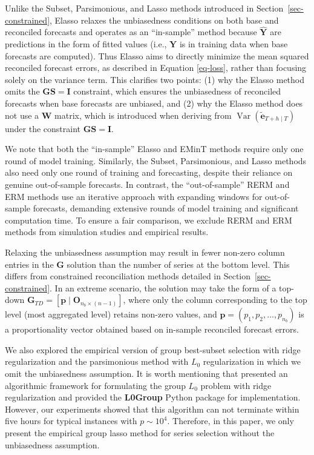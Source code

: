 \documentclass[
  11pt]{article}
\theoremstyle{plain}
\theoremstyle{remark}
\begin{document}
Unlike the Subset, Parsimonious, and Lasso methods introduced in
Section~\ref{sec-constrained}, Elasso relaxes the unbiasedness
conditions on both base and reconciled forecasts and operates as an
``in-sample'' method because \(\hat{\bm{Y}}\) are predictions in the
form of fitted values (i.e., \(\bm{Y}\) is in training data when base
forecasts are computed). Thus Elasso aims to directly minimize the mean
squared reconciled forecast errors, as described in Equation
\eqref{eq-loss}, rather than focusing solely on the variance term. This
clarifies two points: (1) why the Elasso method omits the
\(\bm{GS}=\bm{I}\) constraint, which ensures the unbiasedness of
reconciled forecasts when base forecasts are unbiased, and (2) why the
Elasso method does not use a \(\bm{W}\) matrix, which is introduced when
deriving from \(\operatorname{Var}(\tilde{\bm{e}}_{T+h \mid T})\) under
the constraint \(\bm{GS}=\bm{I}\).

We note that both the ``in-sample'' Elasso and EMinT methods require
only one round of model training. Similarly, the Subset, Parsimonious,
and Lasso methods also need only one round of training and forecasting,
despite their reliance on genuine out-of-sample forecasts. In contrast,
the ``out-of-sample'' RERM and ERM methods use an iterative approach
with expanding windows for out-of-sample forecasts, demanding extensive
rounds of model training and significant computation time. To ensure a
fair comparison, we exclude RERM and ERM methods from simulation studies
and empirical results.

Relaxing the unbiasedness assumption may result in fewer non-zero column
entries in the \(\bm{G}\) solution than the number of series at the
bottom level. This differs from constrained reconciliation methods
detailed in Section~\ref{sec-constrained}. In an extreme scenario, the
solution may take the form of a top-down
\(\bm{G}_{TD}=[\bm{p} \mid \bm{O}_{n_b \times (n-1)}]\), where only the
column corresponding to the top level (most aggregated level) retains
non-zero values, and \(\bm{p} = (p_1, p_2, \ldots, p_{n_b})\) is a
proportionality vector obtained based on in-sample reconciled forecast
errors.

We also explored the empirical version of group best-subset selection
with ridge regularization and the parsimonious method with \(L_0\)
regularization in which we omit the unbiasedness assumption. It is worth
mentioning that \citet{Hazimeh2023-ie} presented an algorithmic
framework for formulating the group \(L_0\) problem with ridge
regularization and provided the \textbf{L0Group} Python package for
implementation. However, our experiments showed that this algorithm can
not terminate within five hours for typical instances with
\(p \sim 10^4\). Therefore, in this paper, we only present the empirical
group lasso method for series selection without the unbiasedness
assumption.
\end{document}
